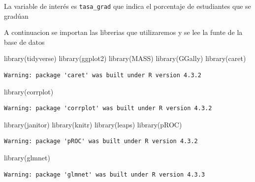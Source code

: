\documentclass[
  letterpaper,
  DIV=11,
  numbers=noendperiod]{scrartcl}
\newenvironment{Shaded}{\begin{snugshade}}{\end{snugshade}}
\newcommand{\FunctionTok}[1]{\textcolor[rgb]{0.28,0.35,0.67}{#1}}
\newcommand{\NormalTok}[1]{\textcolor[rgb]{0.00,0.23,0.31}{#1}}
\begin{document}
La variable de interés es \texttt{tasa\_grad} que indica el porcentaje
de estudiantes que se gradúan

A continuacion se importan las librerias que utilizaremos y se lee la
funte de la base de datos

\begin{Shaded}
\begin{Highlighting}[]
\FunctionTok{library}\NormalTok{(tidyverse)}
\FunctionTok{library}\NormalTok{(ggplot2)}
\FunctionTok{library}\NormalTok{(MASS)}
\FunctionTok{library}\NormalTok{(GGally)}
\FunctionTok{library}\NormalTok{(caret)}
\end{Highlighting}
\end{Shaded}

\begin{verbatim}
Warning: package 'caret' was built under R version 4.3.2
\end{verbatim}

\begin{Shaded}
\begin{Highlighting}[]
\FunctionTok{library}\NormalTok{(corrplot)}
\end{Highlighting}
\end{Shaded}

\begin{verbatim}
Warning: package 'corrplot' was built under R version 4.3.2
\end{verbatim}

\begin{Shaded}
\begin{Highlighting}[]
\FunctionTok{library}\NormalTok{(janitor)}
\FunctionTok{library}\NormalTok{(knitr)}
\FunctionTok{library}\NormalTok{(leaps)}
\FunctionTok{library}\NormalTok{(pROC)}
\end{Highlighting}
\end{Shaded}

\begin{verbatim}
Warning: package 'pROC' was built under R version 4.3.2
\end{verbatim}

\begin{Shaded}
\begin{Highlighting}[]
\FunctionTok{library}\NormalTok{(glmnet)}
\end{Highlighting}
\end{Shaded}

\begin{verbatim}
Warning: package 'glmnet' was built under R version 4.3.3
\end{verbatim}
\end{document}
